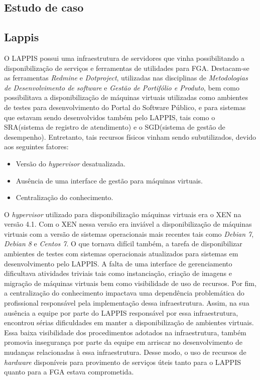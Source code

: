 \begin{apendicesenv}

\partapendices
\chapter{Estudo de caso}
\label{cap:estudo_caso}
\section{Lappis}
O LAPPIS possui uma infraestrutura de servidores que vinha possibilitando a disponibilização de serviços e ferramentas de utilidades para FGA. Destacam-se as ferramentas \textit{Redmine} e \textit{Dotproject}, utilizadas nas disciplinas de \textit{Metodologias de Desenvolvimento de software} e \textit{Gestão de Portifólio e Produto}, bem como possibilitava a disponibilização de máquinas virtuais utilizadas como ambientes de testes para desenvolvimento do Portal do Software Público, e para sistemas que estavam sendo desenvolvidos também pelo  LAPPIS, tais como o SRA(sistema de registro de atendimento) e o SGD(sistema de gestão de desempenho). Entretanto, tais recursos físicos vinham sendo subutilizados, devido aos seguintes fatores:
\begin{itemize}
 \item Versão do \textit{hypervisor} desatualizada.
 \item Ausência de uma interface de gestão para máquinas virtuais.
 \item Centralização do conhecimento.
\end{itemize}
      
      O \textit{hypervisor} utilizado para disponibilização máquinas virtuais era o XEN na versão 4.1. Com o XEN nessa versão era inviável a disponibilização de máquinas virtuais com a versão de sistemas operacionais mais recentes tais como \textit{Debian 7}, \textit{Debian 8} e \textit{Centos 7}. O que tornava difícil também, a tarefa de disponibilizar ambientes de testes com sistemas operacionais atualizados para sistemas em desenvolvimento pelo LAPPIS. A falta de uma interface de gerenciamento dificultava atividades triviais tais como instanciação, criação de imagens e migração de máquinas virtuais bem como visibilidade de uso de recursos. Por fim, a centralização do conhecimento impactava uma dependência problemática do profissional responsável pela implementação dessa infraestrutura. Assim, na sua ausência a equipe por parte do LAPPIS responsável por essa infraestrutura, encontrou sérias dificuldades em manter a disponibilização de ambientes virtuais. Essa baixa visibilidade dos procedimentos adotados na infraestrutura, também promovia insegurança por parte da equipe em arriscar no desenvolvimento de mudanças relacionadas à essa infraestrutura. Desse modo, o uso de recursos de \textit{hardware} disponíveis para provimento de serviços úteis tanto para o LAPPIS quanto para a FGA estava comprometida. 
      

\end{apendicesenv}
